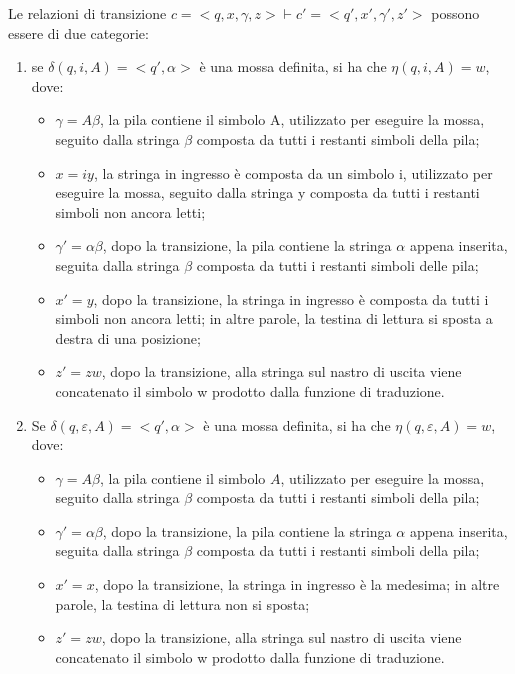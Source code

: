   \break

  \noindent Le relazioni di transizione \(c =<q,x,\gamma, z> \vdash c' = <q',x',\gamma',z'>\) possono essere di due categorie:
  \begin{enumerate}
    \item se \(\delta(q,i,A)=<q',\alpha>\) è una mossa definita, si ha che \(\eta(q,i,A) = w\), dove:
    \begin{itemize}
      \item \(\gamma =A\beta\), la pila contiene il simbolo A, utilizzato per eseguire la mossa, seguito dalla stringa \(\beta\) composta da tutti i restanti simboli della pila;
      \item \(x=iy\), la stringa in ingresso è composta da un simbolo i, utilizzato per eseguire la mossa, seguito dalla stringa y composta da tutti i restanti simboli non ancora letti;
      \item \(\gamma'=\alpha\beta\), dopo la transizione, la pila contiene la stringa \(\alpha\) appena inserita, seguita dalla stringa \(\beta\) composta da tutti i restanti simboli delle pila;
      \item \(x'=y\), dopo la transizione, la stringa in ingresso è composta da tutti i simboli non ancora letti; in altre parole, la testina di lettura si sposta a destra di una posizione;
      \item \(z'=zw\), dopo la transizione, alla stringa sul nastro di uscita viene concatenato il simbolo w prodotto dalla funzione di traduzione.  
    \end{itemize}
    \item Se \(\delta(q,\varepsilon,A)=<q',\alpha>\) è una mossa definita, si ha che \(\eta(q,\varepsilon,A) = w\), dove:
    \begin{itemize}
      \item \(\gamma=A\beta\), la pila contiene il simbolo \(A\), utilizzato per eseguire la mossa, seguito dalla stringa \(\beta\) composta da tutti i restanti simboli della pila;
      \item \(\gamma'=\alpha\beta\), dopo la transizione, la pila contiene la stringa \(\alpha\) appena inserita, seguita dalla stringa \(\beta\) composta da tutti i restanti simboli della pila;
      \item \(x'=x\), dopo la transizione, la stringa in ingresso è la medesima; in altre parole, la testina di lettura non si sposta;
      \item \(z'=zw\), dopo la transizione, alla stringa sul nastro di uscita viene concatenato il simbolo w prodotto dalla funzione di traduzione.
    \end{itemize}
  \end{enumerate}

